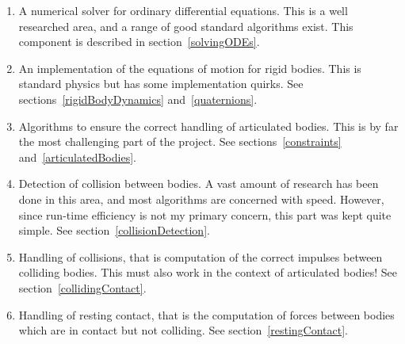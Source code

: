\begin{enumerate}
\item A numerical solver for ordinary differential equations. This is a well researched area, and
    a range of good standard algorithms exist. This component is described in
    section~\ref{solvingODEs}.
\item An implementation of the equations of motion for rigid bodies. This is standard physics but
    has some implementation quirks. See sections~\ref{rigidBodyDynamics} and~\ref{quaternions}.
\item Algorithms to ensure the correct handling of articulated bodies. This is by far the most
    challenging part of the project. See sections~\ref{constraints} and~\ref{articulatedBodies}.
\item Detection of collision between bodies. A vast amount of research has been done in this area,
    and most algorithms are concerned with speed. However, since run-time efficiency is not my
    primary concern, this part was kept quite simple. See section~\ref{collisionDetection}.
\item Handling of collisions, that is computation of the correct impulses between colliding
    bodies. This must also work in the context of articulated bodies!
    See section~\ref{collidingContact}.
\item Handling of resting contact, that is the computation of forces between bodies which are in
    contact but not colliding. See section~\ref{restingContact}.
\end{enumerate}
